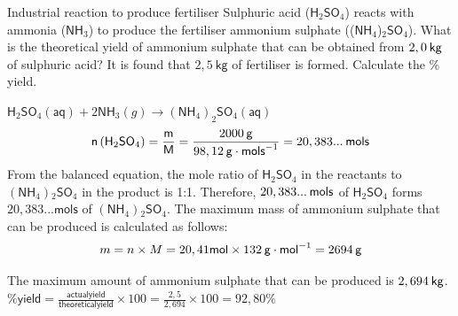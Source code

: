  \par \label{m38712*secfhsst!!!underscore!!!id2067}\vspace{-2cm} 
      \noindent 
      \begin{wex}{Industrial reaction to produce fertiliser }
{
\label{m38712*probfhsst!!!underscore!!!id2068}
      \label{m38712*id284606}Sulphuric acid ($\mathsf{H}{}_{2}\mathsf{SO}{}_{4}$) reacts with ammonia ($\mathsf{NH}{}_{3}$) to produce the fertiliser ammonium sulphate (($\mathsf{NH}{}_{4}$)${}_{2}\mathsf{SO}{}_{4}$). What is the theoretical yield of ammonium sulphate that can be obtained from $2,0\phantom{\rule{2pt}{0ex}}\mathsf{kg}$ of sulphuric acid? It is found that $2,5 ~\mathsf{kg}$ of fertiliser is formed. Calculate the \% yield. }
{
      \label{m38712*id284813}\nopagebreak\noindent{}
\label{m38712*id284690}${\mathsf{H}}_{2}{\mathsf{SO}}_{4}\left(\mathsf{aq}\right)+2{\mathsf{NH}}_{3}\left(g\right)\to {\left({\mathsf{NH}}_{4}\right)}_{2}{\mathsf{SO}}_{4}\left(\mathsf{aq}\right)$
    \begin{equation*}
    \mathsf{n}\left({\mathsf{H}}_{2}{\mathsf{SO}}_{4}\right)=\frac{\mathsf{m}}{\mathsf{M}}=\frac{2 000\phantom{\rule{2pt}{0ex}}\mathsf{g}}{98,12\phantom{\rule{2pt}{0ex}}\mathsf{g}\ensuremath{\cdot}{\mathsf{mols}}^{-1}}=20,383...\phantom{\rule{2pt}{0ex}}\mathsf{mols}
      \end{equation*}
      \label{m38712*id285156}From the balanced equation, the mole ratio of $\mathsf{H}{}_{2}\mathsf{SO}{}_{4}$ in the reactants to $\left(\mathsf{NH}{}_{4}\right){}_{2}\mathsf{SO}{}_{4}$ in the product is 1:1. Therefore, $20,383...\phantom{\rule{2pt}{0ex}}\mathsf{mols}$ of $\mathsf{H}{}_{2}\mathsf{SO}{}_{4}$ forms $20,383... \mathsf{mols}$ of $\left(\mathsf{NH}{}_{4}\right){}_{2}\mathsf{SO}{}_{4}$. 
      \label{m38712*id285290}The maximum mass of ammonium sulphate that can be produced is calculated as follows:
      \label{m38712*id285296}\nopagebreak\noindent{}
    \begin{equation*}
    m=n\ensuremath{\times}M=20,41\mathsf{mol}\ensuremath{\times}132\phantom{\rule{2pt}{0ex}}\mathsf{g}\ensuremath{\cdot}{\mathsf{mol}}^{-1}=2694\phantom{\rule{2pt}{0ex}}\mathsf{g}
      \end{equation*}
      
      \label{m38712*id285362}The maximum amount of ammonium sulphate that can be produced is $2,694\phantom{\rule{2pt}{0ex}}\mathsf{kg}$.
 $\mathsf{\% yield} = \frac{\mathsf{actual yield}}{\mathsf{theoretical yield}} \times 100 = \frac{2,5}{2,694} \times 100 = 92,80 \%$
}
    \end{wex}
